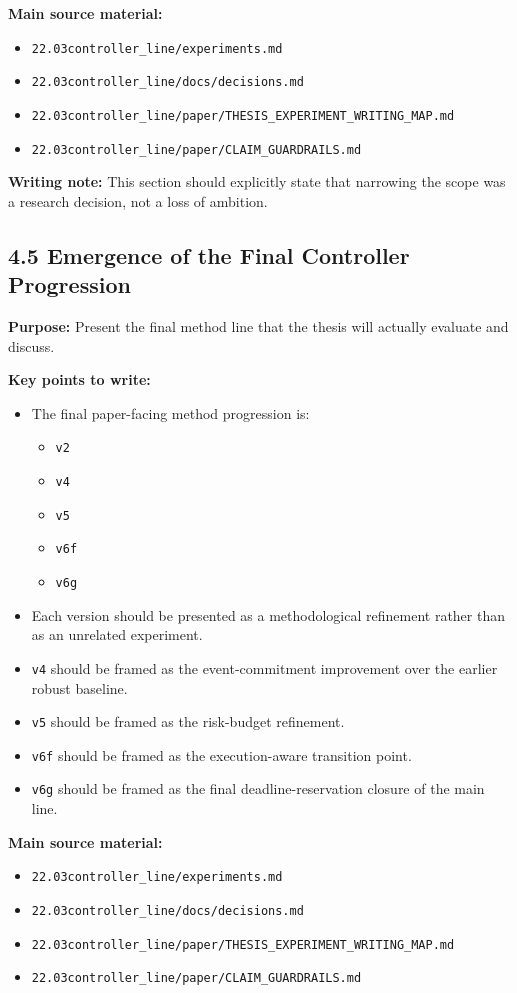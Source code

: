 \textbf{Main source material:}
\begin{itemize}
    \item \texttt{22.03controller_line/experiments.md}
    \item \texttt{22.03controller_line/docs/decisions.md}
    \item \texttt{22.03controller_line/paper/THESIS\_EXPERIMENT\_WRITING\_MAP.md}
    \item \texttt{22.03controller_line/paper/CLAIM\_GUARDRAILS.md}
\end{itemize}

\textbf{Writing note:} This section should explicitly state that narrowing the scope was a research decision, not a loss of ambition.

\subsection*{4.5 Emergence of the Final Controller Progression}
\textbf{Purpose:} Present the final method line that the thesis will actually evaluate and discuss.

\textbf{Key points to write:}
\begin{itemize}
    \item The final paper-facing method progression is:
    \begin{itemize}
        \item \texttt{v2}
        \item \texttt{v4}
        \item \texttt{v5}
        \item \texttt{v6f}
        \item \texttt{v6g}
    \end{itemize}
    \item Each version should be presented as a methodological refinement rather than as an unrelated experiment.
    \item \texttt{v4} should be framed as the event-commitment improvement over the earlier robust baseline.
    \item \texttt{v5} should be framed as the risk-budget refinement.
    \item \texttt{v6f} should be framed as the execution-aware transition point.
    \item \texttt{v6g} should be framed as the final deadline-reservation closure of the main line.
\end{itemize}

\textbf{Main source material:}
\begin{itemize}
    \item \texttt{22.03controller_line/experiments.md}
    \item \texttt{22.03controller_line/docs/decisions.md}
    \item \texttt{22.03controller_line/paper/THESIS\_EXPERIMENT\_WRITING\_MAP.md}
    \item \texttt{22.03controller_line/paper/CLAIM\_GUARDRAILS.md}
\end{itemize}

